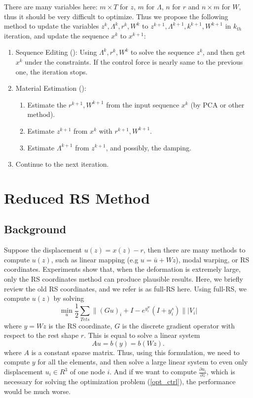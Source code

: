 \documentclass[9pt,twocolumn]{extarticle}
\begin{document}
There are many variables here: $m\times T$ for $z$, $m$ for $\Lambda$,
$n$ for $r$ and $n\times m$ for $W$, thus it should be very difficult
to optimize.  Thus we propose the following method to update the
variables $z^k, \Lambda^k,r^k, W^k$ to $z^{k+1}, \Lambda^{k+1},
k^{k+1}, W^{k+1}$ in $k_{th}$ iteration, and update the sequence $x^k$
to $x^{k+1}$:
\begin{enumerate}
\item Sequence Editing (): Using
  $\Lambda^k, r^k, W^k$ to solve the sequence $z^k$, and then get
  $x^k$ under the constraints.  If the control force is nearly same to
  the previous one, the iteration stops.
\item Material Estimation ():
  \begin{enumerate}
  \item Estimate the $r^{k+1}, W^{k+1}$ from the input sequence $x^k$
    (by PCA or other method).
  \item Estimate $z^{k+1}$ from $x^k$ with $r^{k+1}, W^{k+1}$.
  \item Estimate $\Lambda^{k+1}$ from $z^{k+1}$, and possibly, the
    damping.
  \end{enumerate}
\item Continue to the next iteration.
\end{enumerate}

\section{Reduced RS Method}
\subsection{Background}\label{sec:warping-methods}
Suppose the displacement $u(z)=x(z)-r$, then there are many methods to compute
$u(z)$, such as linear mapping (e.g $u = \bar{u}+Wz$), modal warping, or RS
coordinates. Experiments show that, when the deformation is extremely large,
only the RS coordinates method can produce plausible results. Here, we briefly
review the old RS coordinates, and we refer is as full-RS here. Using full-RS,
we compute $u(z)$ by solving
\begin{equation}
  \min_{u} \frac{1}{2}\sum_{Tets}\|(Gu)_i + I - e^{y_i^w}(I+y_i^s)\||V_i|
\end{equation}
where $y = Wz$ is the RS coordinate, $G$ is the discrete gradient operator with
respect to the rest shape $r$. This is equal to solve a linear system
\begin{equation} \label{rs}
  Au = b(y) = b(Wz).
\end{equation}
where $A$ is a constant sparse matrix. Thus, using this formulation, we need to
compute $y$ for all the elements, and then solve a large linear system to even
only displacement $u_i\in R^{3}$ of one node $i$. And if we want to compute
$\frac{\partial{u_i}}{\partial{z}}$, which is necessary for solving the
optimization problem (\ref{opt_ctrl}), the performance would be much worse.
\end{document}
